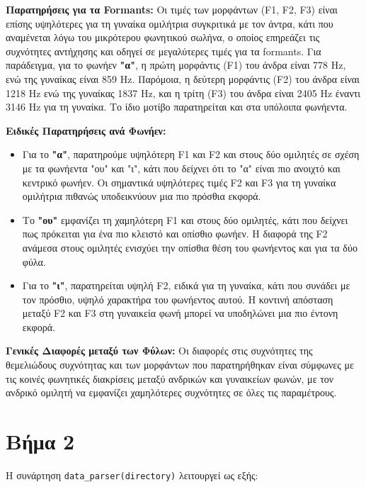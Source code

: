 \documentclass[a4paper,12pt]{article}
\begin{document}
\textbf{Παρατηρήσεις για τα Formants:}
Οι τιμές των μορφάντων (F1, F2, F3) είναι επίσης υψηλότερες για τη γυναίκα ομιλήτρια συγκριτικά με τον άντρα,
κάτι που αναμένεται λόγω του μικρότερου φωνητικού σωλήνα, ο οποίος επηρεάζει τις συχνότητες αντήχησης και οδηγεί σε
μεγαλύτερες τιμές για τα formants. Για παράδειγμα, για το φωνήεν \textbf{"α"}, η πρώτη μορφάντις (F1) του άνδρα είναι
778 Hz, ενώ της γυναίκας είναι 859 Hz. Παρόμοια, η δεύτερη μορφάντις (F2) του άνδρα είναι 1218 Hz ενώ της γυναίκας
1837 Hz, και η τρίτη (F3) του άνδρα είναι 2405 Hz έναντι 3146 Hz για τη γυναίκα. Το ίδιο μοτίβο παρατηρείται και στα υπόλοιπα φωνήεντα.

\textbf{Ειδικές Παρατηρήσεις ανά Φωνήεν:}
\begin{itemize}
    \item Για το \textbf{"α"}, παρατηρούμε υψηλότερη F1 και F2 και στους δύο ομιλητές σε σχέση με τα φωνήεντα "ου" και "ι", κάτι που δείχνει ότι το "α" είναι πιο ανοιχτό και κεντρικό φωνήεν. Οι σημαντικά υψηλότερες τιμές F2 και F3 για τη γυναίκα ομιλήτρια πιθανώς υποδεικνύουν μια πιο πρόσθια εκφορά.
    \item Το \textbf{"ου"} εμφανίζει τη χαμηλότερη F1 και στους δύο ομιλητές, κάτι που δείχνει πως πρόκειται για ένα πιο κλειστό και οπίσθιο φωνήεν. Η διαφορά της F2 ανάμεσα στους ομιλητές ενισχύει την οπίσθια θέση του φωνήεντος και για τα δύο φύλα.
    \item Για το \textbf{"ι"}, παρατηρείται υψηλή F2, ειδικά για τη γυναίκα, κάτι που συνάδει με τον πρόσθιο, υψηλό χαρακτήρα του φωνήεντος αυτού. Η κοντινή απόσταση μεταξύ F2 και F3 στη γυναικεία φωνή μπορεί να υποδηλώνει μια πιο έντονη εκφορά.
\end{itemize}

\textbf{Γενικές Διαφορές μεταξύ των Φύλων:}
Οι διαφορές στις συχνότητες της θεμελιώδους συχνότητας και των μορφάντων που παρατηρήθηκαν είναι σύμφωνες με τις κοινές φωνητικές διακρίσεις μεταξύ ανδρικών και γυναικείων φωνών, με τον ανδρικό ομιλητή να εμφανίζει χαμηλότερες συχνότητες σε όλες τις παραμέτρους.

\section*{Βήμα 2}

Η συνάρτηση \texttt{data\_parser(directory)} λειτουργεί ως εξής:
\end{document}
